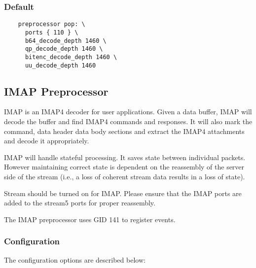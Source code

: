 \documentclass[english]{report}
\begin{document}
\subsubsection{Default}

\begin{verbatim}
	preprocessor pop: \
	  ports { 110 } \
	  b64_decode_depth 1460 \
	  qp_decode_depth 1460 \
	  bitenc_decode_depth 1460 \
	  uu_decode_depth 1460
\end{verbatim}

\subsection{IMAP Preprocessor}
\label{IMAP}

IMAP is an IMAP4 decoder for user applications. Given a data buffer,
IMAP will decode the buffer and find IMAP4 commands and responses.
It will also mark the command, data header data body sections and
extract the IMAP4 attachments and decode it appropriately.

IMAP will handle stateful processing. It saves state between individual
packets. However maintaining correct state is dependent on the reassembly
of the server side of the stream (i.e., a loss of coherent stream data results
in a loss of state).

Stream should be turned on for IMAP. Please ensure that the IMAP ports are added
 to the stream5 ports for proper reassembly.

The IMAP preprocessor uses GID 141 to register events.

\subsubsection{Configuration}

The configuration options are described below:
\end{document}
